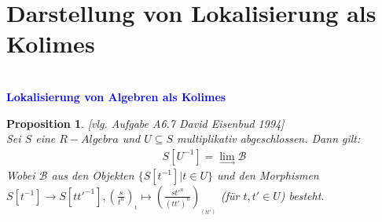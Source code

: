 \documentclass[10pt,a4paper]{report}
\newcommand{\ModulsOfDifferenzials}{David Eisenbud 1994}
\newcounter{Aussage}[chapter]
\newtheorem{prop}[Aussage]{Proposition}
\newcommand{\lok}[2]{#1 [#2^{-1}]}
\newcommand{\loke}[3]{(\frac{#1}{#2})_{_{#3}}}
\newcommand{\colimes}[0]{\lim\limits_{ \longrightarrow }}
\begin{document}
\section{Darstellung von Lokalisierung als Kolimes}
\ \\
\textcolor{blue}{\textbf{Lokalisierung von Algebren als Kolimes}}
\begin{prop}\label{Lokalisierung von Algebren als Kolimes} \textit{[vlg. Aufgabe A6.7 \ModulsOfDifferenzials]} \\
Sei $S$ eine $R-Algebra$ und $U \subseteq S$ multiplikativ abgeschlossen.
Dann gilt:
\begin{gather*}
 S[U^{-1}] = \colimes \mathcal{B}
\end{gather*}
Wobei $\mathcal{B}$ aus den Objekten $\lbrace \lok{S}{t} \vert t \in U \rbrace$ und den Morphismen\\
$\lok{S}{t} \longrightarrow \lok{S}{tt'}, \loke{s}{t^n}{t} \longmapsto \loke{st'^n}{(tt')^n}{(tt')}$ (für $t,t' \in U$) besteht.
\end{prop}
\end{document}
